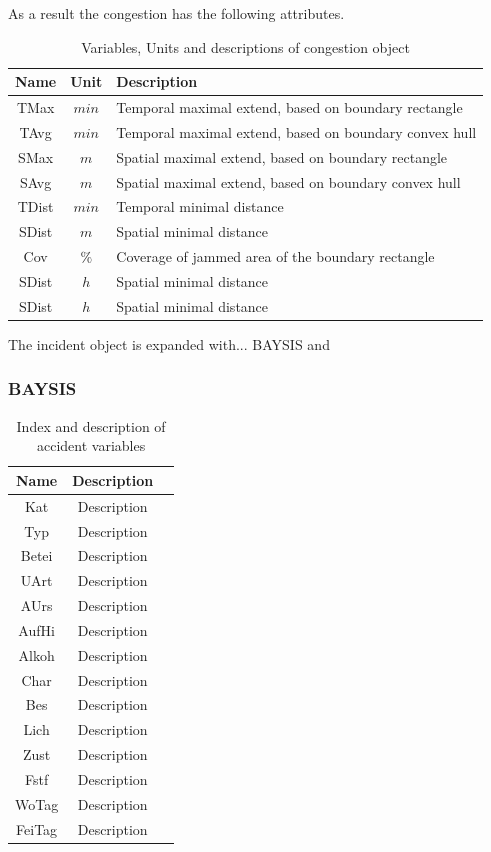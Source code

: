 As a result the congestion has the following attributes.
\begin{table}[ht]
	\centering
	\begin{tabular}{c|c|l} 
		\toprule
		Name & Unit & Description \\
		\midrule 
		TMax & $min$ & Temporal maximal extend, based on boundary rectangle\\
		TAvg & $min$ & Temporal maximal extend, based on boundary convex hull\\
		SMax & $m$ & Spatial maximal extend, based on boundary rectangle\\
		SAvg & $m$ & Spatial maximal extend, based on boundary convex hull\\
		TDist & $min$ & Temporal minimal distance\\
		SDist & $m$ & Spatial minimal distance\\
		Cov & $\%$ & Coverage of jammed area of the boundary rectangle\\
		SDist & $h$ & Spatial minimal distance\\
		SDist & $h$ & Spatial minimal distance\\
		\bottomrule
	\end{tabular}
	\caption{Variables, Units and descriptions of congestion object}
\end{table}

\bigskip
    
The incident object is expanded with... BAYSIS and 

\subsubsection{BAYSIS}


\noindent
\begin{table}[ht]
	\centering
	\begin{tabular}{c|c|l} 
		\toprule
		Name & Description \\
		\midrule 
		Kat & Description \\
		Typ & Description \\
		Betei & Description \\
		UArt & Description \\
		AUrs & Description \\
		AufHi & Description \\
		Alkoh & Description \\
		Char & Description \\
		Bes & Description \\
		Lich & Description \\
		Zust & Description \\
		Fstf & Description \\
		WoTag & Description \\
		FeiTag & Description \\
		\bottomrule
	\end{tabular}
	\caption{Index and description of accident variables}
\end{table}

